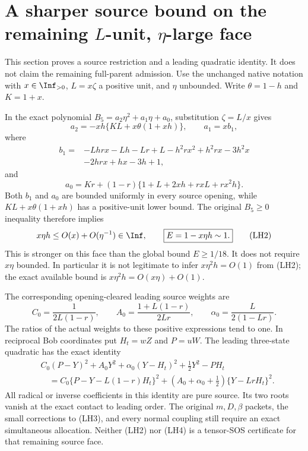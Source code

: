 \section[A sharper source bound on the L-unit, eta-large face]{A sharper source bound on the remaining $L$-unit, $\eta$-large face}
\label{sec:r7-c1-L-unit-eta-large-frontier}

This section proves a source restriction and a leading quadratic
identity.  It does not claim the remaining full-parent admission.
Use the unchanged native notation with $x\in\Inf_{>0}$,
$L=x\zeta$ a positive unit, and $\eta$ unbounded.  Write
$\theta=1-h$ and $K=1+x$.

In the exact polynomial $B_5=a_2\eta^2+a_1\eta+a_0$, substitution
$\zeta=L/x$ gives
\[
 a_2=-xh\{KL+x\theta(1+xh)\},\qquad a_1=xb_1,
                                                               \tag{LH1}
\]
where
\[
\begin{split}
 b_1={}&-Lhrx-Lh-Lr+L-h^2rx^2+h^2rx-3h^2x\\
       &-2hrx+hx-3h+1,
\end{split}
\]
and
\[
 a_0=Kr+(1-r)\{1+L+2xh+rxL+rx^2h\}.
\]
Both $b_1$ and $a_0$ are bounded uniformly in every source opening,
while $KL+x\theta(1+xh)$ has a positive-unit lower bound.
The original $B_5\ge0$ inequality therefore implies
\[
 x\eta h\le O(x)+O(\eta^{-1})\in\Inf,
 \qquad\boxed{E=1-x\eta h\sim1.}                       \tag{LH2}
\]
This is stronger on this face than the global bound $E\ge1/18$.
It does not require $x\eta$ bounded.  In particular it is not
legitimate to infer $x\eta^2h=O(1)$ from (LH2); the exact available
bound is $x\eta^2h=O(x\eta)+O(1)$.

The corresponding opening-cleared leading source weights are
\[
 C_0=\frac1{2L(1-r)},\qquad
 A_0=\frac{1+L(1-r)}{2Lr},\qquad
 \alpha_0=\frac L{2(1-Lr)}.                              \tag{LH3}
\]
The ratios of the actual weights to these positive expressions
tend to one.  In reciprocal Bob coordinates put $H_t=wZ$ and
$P=uW$.  The leading three-state quadratic has the exact identity
\[
\begin{split}
 &C_0(P-Y)^2+A_0Y^2+\alpha_0(Y-H_t)^2
       +\tfrac12Y^2-PH_t\\
 &\quad=C_0\{P-Y-L(1-r)H_t\}^2
       +(A_0+\alpha_0+\tfrac12)\{Y-LrH_t\}^2.
\end{split}                                             \tag{LH4}
\]
All radical or inverse coefficients in this identity are pure source.
Its two roots vanish at the exact contact to leading order.
The original $m,D,\beta$ packets, the small corrections to (LH3),
and every normal coupling still require an exact simultaneous
allocation.  Neither (LH2) nor (LH4) is a tensor-SOS certificate for
that remaining source face.

